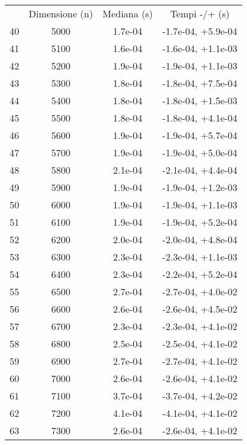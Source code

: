 \begin{table}
\centering
\begin{adjustbox}{width=1\textwidth/2}
\begin{tabular}{|c|c|c|c|}
\hline
 & Dimensione (n) & Mediana (s) & Tempi -/+ (s) \\
40 & 5000 & 1.7e-04 & -1.7e-04, +5.9e-04 \\
\cline{1-4}
41 & 5100 & 1.6e-04 & -1.6e-04, +1.1e-03 \\
\cline{1-4}
42 & 5200 & 1.9e-04 & -1.9e-04, +1.1e-03 \\
\cline{1-4}
43 & 5300 & 1.8e-04 & -1.8e-04, +7.5e-04 \\
\cline{1-4}
44 & 5400 & 1.8e-04 & -1.8e-04, +1.5e-03 \\
\cline{1-4}
45 & 5500 & 1.8e-04 & -1.8e-04, +4.1e-04 \\
\cline{1-4}
46 & 5600 & 1.9e-04 & -1.9e-04, +5.7e-04 \\
\cline{1-4}
47 & 5700 & 1.9e-04 & -1.9e-04, +5.0e-04 \\
\cline{1-4}
48 & 5800 & 2.1e-04 & -2.1e-04, +4.4e-04 \\
\cline{1-4}
49 & 5900 & 1.9e-04 & -1.9e-04, +1.2e-03 \\
\cline{1-4}
50 & 6000 & 1.9e-04 & -1.9e-04, +1.1e-03 \\
\cline{1-4}
51 & 6100 & 1.9e-04 & -1.9e-04, +5.2e-04 \\
\cline{1-4}
52 & 6200 & 2.0e-04 & -2.0e-04, +4.8e-04 \\
\cline{1-4}
53 & 6300 & 2.3e-04 & -2.3e-04, +1.1e-03 \\
\cline{1-4}
54 & 6400 & 2.3e-04 & -2.2e-04, +5.2e-04 \\
\cline{1-4}
55 & 6500 & 2.7e-04 & -2.7e-04, +4.0e-02 \\
\cline{1-4}
56 & 6600 & 2.6e-04 & -2.6e-04, +4.5e-02 \\
\cline{1-4}
57 & 6700 & 2.3e-04 & -2.3e-04, +4.1e-02 \\
\cline{1-4}
58 & 6800 & 2.5e-04 & -2.5e-04, +4.1e-02 \\
\cline{1-4}
59 & 6900 & 2.7e-04 & -2.7e-04, +4.1e-02 \\
\cline{1-4}
60 & 7000 & 2.6e-04 & -2.6e-04, +4.1e-02 \\
\cline{1-4}
61 & 7100 & 3.7e-04 & -3.7e-04, +4.2e-02 \\
\cline{1-4}
62 & 7200 & 4.1e-04 & -4.1e-04, +4.1e-02 \\
\cline{1-4}
63 & 7300 & 2.6e-04 & -2.6e-04, +4.1e-02 \\

\end{tabular}
\end{adjustbox}
\end{table}
